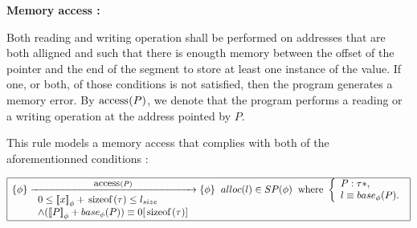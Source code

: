 \documentclass[a4paper,twoside,12pt]{report}
\newcommand{\Sp}[1]{SP(#1)} %
\newcommand{\Alloc}[1]{alloc(#1)}
\newcommand{\Emp}{\lstinline{Emp}}
\newcommand{\EqLoc}[2]{ (#1 = #2) }
\newcommand{\Andpure}[2]{ #1 \wedge #2}
\newcommand{\Pointsto}[2]{ #1 \mapsto #2}
\newcommand{\Formula}[2]{ #1  \updownarrow #2}
\newcommand{\ptrexp}[3]{\left ( \begin{array}{l} 
\ptrbase{#1}=#2 \\ 
\ptroffset{#1}=#3
\end{array} \right )}
\newcommand{\base}[2]{base_{#1}(#2)}
\newcommand{\lsize}[1]{#1_{size}}
\newcommand{\transmodel}[4]{\lbrace #1 \rbrace \arrow{#2}{#3} \lbrace #4 \rbrace }
\newcommand{\ptrbase}[1]{{#1}_{base}}
\newcommand{\ptroffset}[1]{{#1}_{off}}
\newcommand{\seq}[0]{\equiv} %
\newcommand{\intptr}[2]{\left ( \begin{array}{l} {#1} \\ {#2} 

\end{array} \right )}
\newcommand{\congmod}[3]{#1 \equiv #2 \lbrack #3 \rbrack}
\newcommand{\interpa}[2]{\sem{#2}_{#1}}
\newcommand{\sizeof}[1]{\mbox{\lstinline!sizeof!}(#1)}
\newcommand{\accs}[1]{\mbox{\lstinline!access!}(#1)}
\begin{document}
%
%
%
%
%
%
%
%
%
%
%
\textbf{Memory access :}

Both reading and writing operation shall be performed on  addresses that are both alligned and
such that there is enougth memory between the offset of the pointer and the end of the segment to store at least one instance of the value. If one, or both, of those conditions is not satisfied, then the program generates a memory error. By $\accs{P}$, we denote that the program performs a reading or a writing operation at the address pointed by $P$.

This rule models a memory access that complies with both of the aforementionned conditions :

$$
\begin{array}{|l|}
\hline
\transmodel{\phi}{\accs{P}}{
\begin{array}{l}
0 \leq \interpa{\phi}{x}+\sizeof{\tau}\leq \lsize{l} \\
 \wedge \congmod{(\interpa{\phi}{P}+\base{\phi}{P})
}{0}{\sizeof{\tau}}
\end{array}
}{\phi} \gspace \Alloc{l}\in \Sp{\phi} \gspace \mbox{where } \left \lbrace \begin{array}{l} P:\tau *, \\l\seq \base{\phi}{P}.\\ \end{array} \right.\\
\hline
\end{array}
$$
\end{document}
